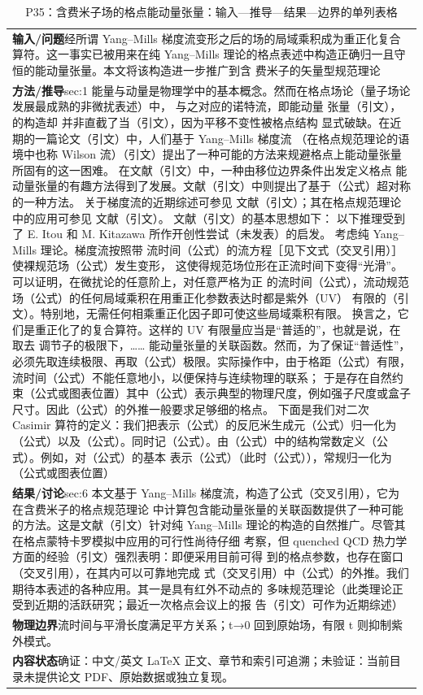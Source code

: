 \documentclass[UTF8,11pt,oneside]{ctexbook}
\begin{document}
\begin{table}[htbp]
  \centering
  \caption*{P35：含费米子场的格点能动量张量：输入—推导—结果—边界的单列表格}
  \small
  \begin{tabular}{@{}p{}@{}}
    \toprule
    \textbf{输入/问题}\quad 经所谓 Yang–Mills 梯度流变形之后的场的局域乘积成为重正化复合算符。这一事实已被用来在纯 Yang–Mills 理论的格点表述中构造正确归一且守恒的能动量张量。本文将该构造进一步推广到含 费米子的矢量型规范理论 \\
    \textbf{方法/推导}\quad sec:1 能量与动量是物理学中的基本概念。然而在格点场论（量子场论发展最成熟的非微扰表述）中， 与之对应的诺特流，即能动量 张量（引文），的构造却 并非直截了当（引文），因为平移不变性被格点结构 显式破缺。在近期的一篇论文（引文）中，人们基于 Yang–Mills 梯度流 （在格点规范理论的语境中也称 Wilson 流）（引文）提出了一种可能的方法来规避格点上能动量张量所固有的这一困难。 在文献（引文）中，一种由移位边界条件出发定义格点 能动量张量的有趣方法得到了发展。文献（引文）中则提出了基于（公式）超对称的一种方法。 关于梯度流的近期综述可参见 文献（引文）；其在格点规范理论中的应用可参见 文献（引文）。 文献（引文）的基本思想如下： 以下推理受到了 E. Itou 和 M. Kitazawa 所作开创性尝试（未发表）的启发。 考虑纯 Yang–Mills 理论。梯度流按照带 流时间（公式）的流方程［见下文式（交叉引用）］使裸规范场（公式）发生变形， 这使得规范场位形在正流时间下变得“光滑”。可以证明，在微扰论的任意阶上，对任意严格为正 的流时间（公式），流动规范场（公式）的任何局域乘积在用重正化参数表达时都是紫外（UV） 有限的（引文）。特别地，无需任何相乘重正化因子即可使这些局域乘积有限。 换言之，它们是重正化了的复合算符。这样的 UV 有限量应当是“普适的”，也就是说，在取去 调节子的极限下，…… 能动量张量的关联函数。然而，为了保证“普适性”，必须先取连续极限、再取（公式）极限。实际操作中，由于格距（公式）有限，流时间（公式）不能任意地小，以便保持与连续物理的联系； 于是存在自然约束（公式或图表位置）其中（公式）表示典型的物理尺度，例如强子尺度或盒子尺寸。因此（公式）的外推一般要求足够细的格点。 下面是我们对二次 Casimir 算符的定义：我们把表示（公式）的反厄米生成元（公式）归一化为（公式）以及（公式）。同时记（公式）。由（公式）中的结构常数定义（公式）。例如，对（公式）的基本 表示（公式）（此时（公式）），常规归一化为（公式或图表位置） \\
    \textbf{结果/讨论}\quad sec:6 本文基于 Yang–Mills 梯度流，构造了公式（交叉引用），它为在含费米子的格点规范理论 中计算包含能动量张量的关联函数提供了一种可能的方法。这是文献（引文）针对纯 Yang–Mills 理论的构造的自然推广。尽管其在格点蒙特卡罗模拟中应用的可行性尚待仔细 考察，但 quenched QCD 热力学方面的经验（引文）强烈表明：即便采用目前可得 到的格点参数，也存在窗口（交叉引用），在其内可以可靠地完成 式（交叉引用）中（公式）的外推。我们期待本表述的各种应用。其一是具有红外不动点的 多味规范理论（此类理论正受到近期的活跃研究；最近一次格点会议上的报 告（引文）可作为近期综述） \\
    \textbf{物理边界}\quad 流时间与平滑长度满足平方关系；t→0 回到原始场，有限 t 则抑制紫外模式。 \\
    \textbf{内容状态}\quad 确证：中文/英文 LaTeX 正文、章节和索引可追溯；未验证：当前目录未提供论文 PDF、原始数据或独立复现。 \\
    \bottomrule
  \end{tabular}
\end{table}
\end{document}
